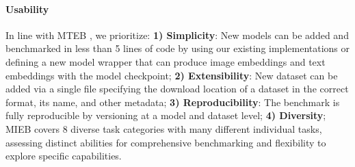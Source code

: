 \paragraph{Usability} In line with MTEB \cite{muennighoff2023mteb}, we prioritize: \textbf{1) Simplicity}: New models can be added and benchmarked in less than 5 lines of code by using our existing implementations or defining a new model wrapper that can produce image embeddings and text embeddings with the model checkpoint; \textbf{2) Extensibility}: New dataset can be added via a single file specifying the download location of a dataset in the correct format, its name, and other metadata; \textbf{3) Reproducibility}: The benchmark is fully reproducible by versioning at a model and dataset level; \textbf{4) Diversity}; MIEB covers 8 diverse task categories with many different individual tasks, assessing distinct abilities for comprehensive benchmarking and flexibility to explore specific capabilities.